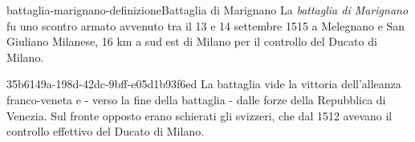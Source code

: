 \documentclass[preview]{standalone}
\begin{document}

\begin{snippetdefinition}{battaglia-marignano-definizione}{Battaglia di Marignano}
    La \textit{battaglia di Marignano} fu uno scontro armato avvenuto tra il 13 e 14
    settembre 1515 a Melegnano e San Giuliano Milanese,
    16 km a sud est di Milano per il controllo del Ducato di Milano. 
\end{snippetdefinition}

\begin{snippet}{35b6149a-198d-42dc-9bff-e05d1b93f6ed}
    La battaglia vide la vittoria dell'alleanza franco-veneta
    e - verso la fine della battaglia - dalle forze della Repubblica di Venezia.
    Sul fronte opposto erano schierati gli svizzeri, che dal 1512 avevano il controllo
    effettivo del Ducato di Milano.
\end{snippet}

\end{document}
